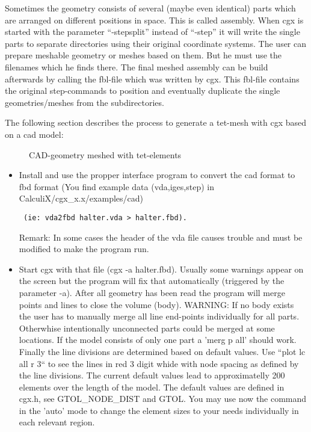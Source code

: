 \documentclass{article}
\begin{document}
\begin{appendix}
\begin{itemize}
Sometimes the geometry consists of several (maybe even identical) parts which are arranged on different positions in space. This is called assembly. When cgx is started with the parameter ``-stepsplit'' instead of ``-step'' it will write the single parts to separate directories using their original coordinate systems. The user can prepare meshable geometry or meshes based on them. But he must use the filenames which he finds there. The final meshed assembly can be build afterwards by calling the fbl-file which was written by cgx. This fbl-file contains the original step-commands to position and eventually duplicate the single geometries/meshes from the subdirectories.   
\end{itemize}

The following section describes the process to generate a tet-mesh with cgx based on a cad model:


\begin{figure}[h]
\caption{\label{halter} CAD-geometry meshed with tet-elements }
\end{figure}

\begin{itemize}

\item Install and use the propper interface program to convert the cad format to fbd format (You find example data (vda,iges,step) in CalculiX/cgx\_x.x/examples/cad)\begin{verbatim} (ie: vda2fbd halter.vda > halter.fbd). \end{verbatim} Remark: In some cases the header of the vda file causes trouble and must be modified to make the program run.

\item Start cgx with that file (cgx -a halter.fbd). Usually some warnings appear on the screen but the program will fix that automatically (triggered by the parameter -a). After all geometry has been read the program will merge points and lines to close the volume (body). WARNING: If no body exists the user has to manually merge all line end-points individually for all parts. Otherwhise intentionally unconnected parts could be merged at some locations. If the model consists of only one part a 'merg p all' should work. Finally the line divisions are determined based on default values. Use ``plot lc all r 3`` to see the lines in red 3 digit whide with node spacing as defined by the line divisions. The current default values lead to approximatelly 200 elements over the length of the model. The default values are defined in cgx.h, see GTOL\_NODE\_DIST and GTOL. You may use now the command  in the 'auto' mode to change the element sizes to your needs individually in each relevant region.


\end{itemize}
\end{appendix}
\end{document}
